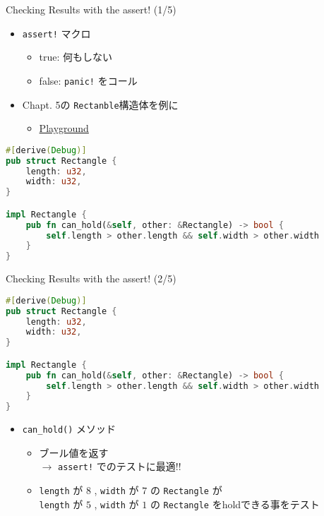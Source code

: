 \documentclass[cjk,14pt,xcolor=dvipsnames,table,dvipdfmx,professional font,t,fragile]{beamer}
\begin{document}
\begin{frame}[fragile]{Checking Results with the assert! (1/5)}
 \begin{itemize}
  \item \verb|assert!| マクロ
	\begin{itemize}
	 \item true: 何もしない
	 \item false: \verb|panic!| をコール
	\end{itemize}
  \item Chapt. 5の \texttt{Rectanble}構造体を例に
	\begin{itemize}
	 \item 	\href{https://play.integer32.com/?version=stable&mode=debug&edition=2018&gist=dc15fce8e988e1efd0a2dd8d8d87dd27}
		{Playground}
	\end{itemize}
 \end{itemize}
 {\scriptsize
 \begin{lstlisting}[language=Rust,style=boxed,style=colouredRust]
#[derive(Debug)]
pub struct Rectangle {
    length: u32,
    width: u32,
}

impl Rectangle {
    pub fn can_hold(&self, other: &Rectangle) -> bool {
        self.length > other.length && self.width > other.width
    }
}\end{lstlisting}}

\end{frame}

\begin{frame}[fragile]{Checking Results with the assert! (2/5)}
\mbox{}
 {\scriptsize
 \begin{lstlisting}[language=Rust,style=boxed,style=colouredRust]
#[derive(Debug)]
pub struct Rectangle {
    length: u32,
    width: u32,
}

impl Rectangle {
    pub fn can_hold(&self, other: &Rectangle) -> bool {
        self.length > other.length && self.width > other.width
    }
}\end{lstlisting}}
 \begin{itemize}
   \item \verb|can_hold()| メソッド
	 \begin{itemize}
	  \item ブール値を返す\\
		\hspace{3zw} $\rightarrow$ \verb|assert!| でのテストに最適!!
	  \item \verb|length| が $8$ , \verb|width| が $7$ の \verb|Rectangle| が\\
		\verb|length| が $5$ , \verb|width| が $1$ の \verb|Rectangle|
		をholdできる事をテスト
	 \end{itemize}
 \end{itemize}
\end{frame}
\end{document}
